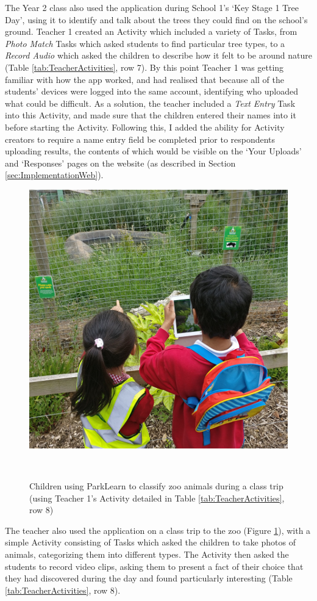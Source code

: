 The Year 2 class also used the application during School 1's `Key Stage 1 Tree Day', using it to identify and talk about the trees they could find on the school's ground. Teacher 1 created an Activity which included a variety of Tasks, from \textit{Photo Match} Tasks which asked students to find particular tree types, to a \textit{Record Audio} which asked the children to describe how it felt to be around nature (Table \ref{tab:TeacherActivities}, row 7). By this point Teacher 1 was getting familiar with how the app worked, and had realised that because all of the students' devices were logged into the same account, identifying who uploaded what could be difficult. As a solution, the teacher included a \textit{Text Entry} Task into this Activity, and made sure that the children entered their names into it before starting the Activity. Following this, I added the ability for Activity creators to require a name entry field be completed prior to respondents uploading results, the contents of which would be visible on the `Your Uploads' and `Responses' pages on the website (as described in Section \ref{sec:ImplementationWeb}).

\begin{figure}
  \centering
  \includegraphics[width=0.6\columnwidth]{images/chapter07/zoo.jpg}
  \caption[Children using ParkLearn during a class trip to the zoo]{Children using ParkLearn to classify zoo animals during a class trip (using Teacher 1's Activity detailed in Table \ref{tab:TeacherActivities}, row 8)}~\label{fig:ParkLearnZoo}
\end{figure}

The teacher also used the application on a class trip to the zoo (Figure \ref{fig:ParkLearnZoo}), with a simple Activity consisting of Tasks which asked the children to take photos of animals, categorizing them into different types. The Activity then asked the students to record video clips, asking them to present a fact of their choice that they had discovered during the day and found particularly interesting (Table \ref{tab:TeacherActivities}, row 8).

